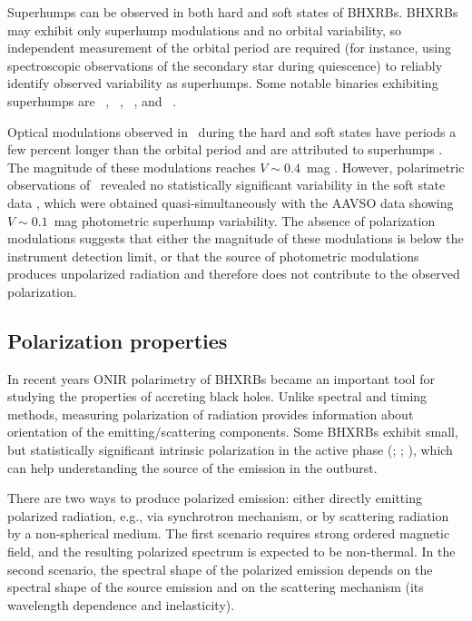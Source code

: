 Superhumps can be observed in both hard and soft states of \glspl{BHXRB}.
\glspl{BHXRB} may exhibit only superhump modulations and no orbital variability, so independent measurement of the orbital period are required (for instance, using spectroscopic observations of the secondary star during quiescence) to reliably identify observed variability as superhumps.
Some notable binaries exhibiting superhumps are \NMus\ \citep{Bailyn1992}, \XTEJxi\ \citep{Zurita2002}, \GX\ \paperVI, and \MAXI\ \citep{Torres2019}.


Optical modulations observed in \MAXI\ during the hard \citep{Patterson2018} and soft states \citep[\gls{AAVSO} data; \paperIV;][]{Kafka2020} have periods a few percent longer than the orbital period and are attributed to superhumps \citep{Torres2019}.
The magnitude of these modulations reaches $V \sim 0.4$~mag \citep{Patterson2018}.
However, polarimetric observations of \MAXI\ revealed no statistically significant variability in the soft state data \paperIVp, which were obtained quasi-simultaneously with the \gls{AAVSO} data showing $V \sim 0.1$~mag photometric superhump variability.
The absence of polarization modulations suggests that either the magnitude of these modulations is below the instrument detection limit, or that the source of photometric modulations produces unpolarized radiation and therefore does not contribute to the observed polarization.


\subsection{Polarization properties}
In recent years \gls{ONIR} polarimetry of \glspl{BHXRB} became an important tool for studying the properties of accreting black holes.
Unlike spectral and timing methods, measuring polarization of radiation provides information about orientation of the emitting/scattering components.
Some \glspl{BHXRB} exhibit small, but statistically significant intrinsic polarization in the active phase (\paperII; \citealt{Russell2018}; \paperIII), which can help understanding the source of the emission in the outburst.

There are two ways to produce polarized emission: either directly emitting polarized radiation, e.g., via synchrotron mechanism, or by scattering radiation by a non-spherical medium.
The first scenario requires strong ordered magnetic field, and the resulting polarized spectrum is expected to be non-thermal.
In the second scenario, the spectral shape of the polarized emission depends on the spectral shape of the source emission and on the scattering mechanism (its wavelength dependence and inelasticity).

